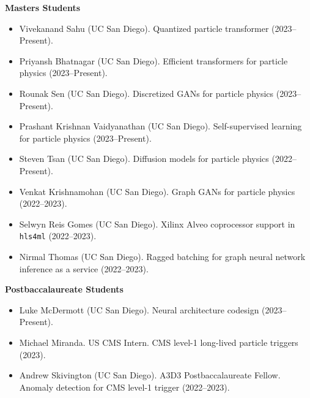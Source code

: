 \documentclass[11pt]{res}
\begin{document}
\begin{resume}
  \textbf{Masters Students}
  \begin{itemize}
    \itemsep-0.3em
    \item Vivekanand Sahu (UC San Diego). Quantized particle transformer (2023--Present).
    \item Priyansh Bhatnagar (UC San Diego). Efficient transformers for particle physics (2023--Present).
    \item Rounak Sen (UC San Diego). Discretized GANs for particle physics (2023--Present).
    \item Prashant Krishnan Vaidyanathan (UC San Diego). Self-supervised learning for particle physics (2023--Present).
    \item Steven Tsan (UC San Diego). Diffusion models for particle physics (2022--Present).
    \item Venkat Krishnamohan (UC San Diego). Graph GANs for particle physics ({2022--2023}).
    \item Selwyn Reis Gomes (UC San Diego). Xilinx Alveo coprocessor support in \texttt{hls4ml} ({2022--2023}).
    \item Nirmal Thomas (UC San Diego). Ragged batching for graph neural network inference as a service ({2022--2023}).
  \end{itemize}

  \textbf{Postbaccalaureate Students}
  \begin{itemize}
    \item Luke McDermott (UC San Diego). Neural architecture codesign (2023--Present).
    \item Michael Miranda. US CMS Intern. CMS level-1 long-lived particle triggers (2023).
    \item Andrew Skivington (UC San Diego). A3D3 Postbaccalaureate Fellow. Anomaly detection for CMS level-1 trigger ({2022--2023}).
  \end{itemize}


\end{resume}
\end{document}
